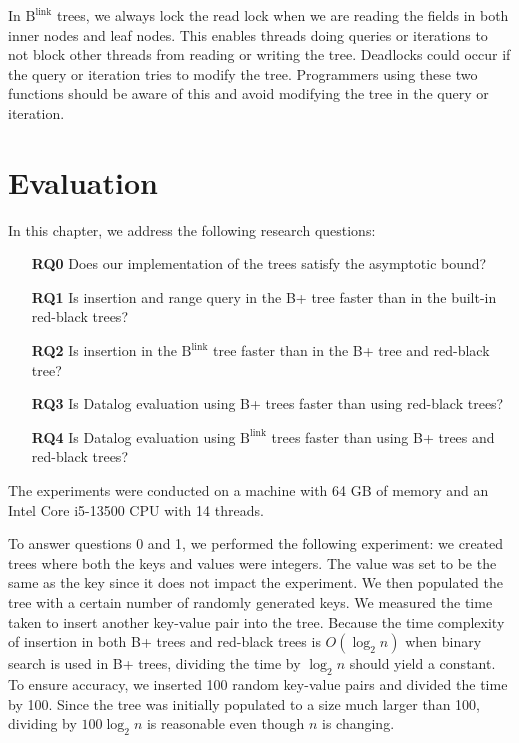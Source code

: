 \documentclass[11pt]{report}
\theoremstyle{definition}
\begin{document}
In $\text{B}^{\text{link}}$ trees, we always lock the read lock when we are reading the fields in both inner nodes and leaf nodes. This enables threads doing queries or iterations to not block other threads from reading or writing the tree. Deadlocks could occur if the query or iteration tries to modify the tree. Programmers using these two functions should be aware of this and avoid modifying the tree in the query or iteration.


\chapter{Evaluation}
\label{ch:evaluation}

In this chapter, we address the following research questions:
\begin{itemize}
  \item[\textbf{RQ0}] Does our implementation of the trees satisfy the asymptotic bound?
  \item[\textbf{RQ1}] Is insertion and range query in the B+ tree faster than in the built-in red-black trees?
  \item[\textbf{RQ2}] Is insertion in the $\text{B}^{\text{link}}$ tree faster than in the B+ tree and red-black tree?
  \item[\textbf{RQ3}] Is Datalog evaluation using B+ trees faster than using red-black trees?
  \item[\textbf{RQ4}] Is Datalog evaluation using $\text{B}^{\text{link}}$ trees faster than using B+ trees and red-black trees?
\end{itemize}

The experiments were conducted on a machine with 64 GB of memory and an Intel Core i5-13500 CPU with 14 threads.

To answer questions 0 and 1, we performed the following experiment: we created trees where both the keys and values were integers. The value was set to be the same as the key since it does not impact the experiment. We then populated the tree with a certain number of randomly generated keys. We measured the time taken to insert another key-value pair into the tree. Because the time complexity of insertion in both B+ trees and red-black trees is $O(\log_2 n)$ when binary search is used in B+ trees, dividing the time by $\log_2 n$ should yield a constant. To ensure accuracy, we inserted 100 random key-value pairs and divided the time by 100. Since the tree was initially populated to a size much larger than 100, dividing by $100 \log_2 n$ is reasonable even though $n$ is changing.
\end{document}
